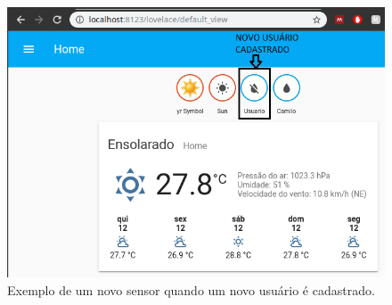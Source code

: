 \begin{figure}[htbp]
	\centering
	\includegraphics[width=1\linewidth]{figuras/homeassistantnewuser.png}
	\caption{Exemplo de um novo sensor quando um novo usuário é cadastrado.}
	\label{fig:homeassistant-new}
\end{figure}


